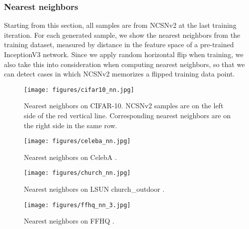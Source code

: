 \documentclass{article}
\begin{document}
\subsubsection{Nearest neighbors}
Starting from this section, all samples are from NCSNv2 at the last training iteration. For each generated sample, we show the nearest neighbors from the training dataset, measured by  distance in the feature space of a pre-trained InceptionV3 network. Since we apply random horizontal flip when training, we also take this into consideration when computing nearest neighbors, so that we can detect cases in which NCSNv2 memorizes a flipped training data point.
\begin{figure}[H]
    \centering
    \texttt{[image: figures/cifar10\_nn.jpg]}
    \caption{Nearest neighbors on CIFAR-10. NCSNv2 samples are on the left side of the red vertical line. Corresponding nearest neighbors are on the right side in the same row.}
    \label{fig:cifar10_nn}
\end{figure}

\begin{figure}[H]
    \centering
    \texttt{[image: figures/celeba\_nn.jpg]}
    \caption{Nearest neighbors on CelebA .}
    \label{fig:celeba_nn}
\end{figure}\begin{figure}[H]
    \centering
    \texttt{[image: figures/church\_nn.jpg]}
    \caption{Nearest neighbors on LSUN church\_outdoor .} \label{fig:church_nn}
\end{figure}\begin{figure}[H]
    \centering
    \texttt{[image: figures/ffhq\_nn\_3.jpg]}
    \caption{Nearest neighbors on FFHQ .} \label{fig:church_nn}
\end{figure}

\newpage
\end{document}
